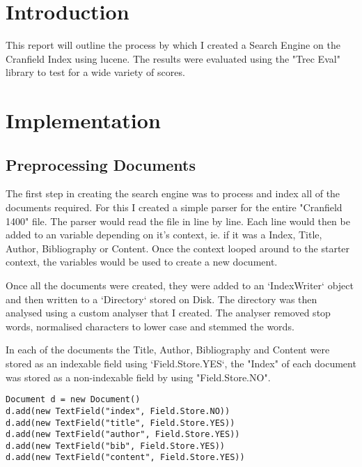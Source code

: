 \section{Introduction}
  This report will outline the process by which I created a Search Engine on the Cranfield Index using lucene.\newline
  The results were evaluated using the "Trec Eval" library to test for a wide variety of scores.

\section{Implementation}
\subsection{Preprocessing Documents}
  The first step in creating the search engine was to process and index all of the documents required. For this I created a simple parser for the entire "Cranfield 1400" file. The parser would read the file in line by line. Each line would then be added to an variable  depending on it's context, ie. if it was a Index, Title, Author, Bibliography or Content. Once the context looped around to the starter context, the variables would be used to create a new document. \par
  Once all the documents were created, they were added to an `IndexWriter` object and then written to a `Directory` stored on Disk. The directory was then analysed using a custom analyser that I created. The analyser removed stop words, normalised characters to lower case and stemmed the words.\par
  In each of the documents the Title, Author, Bibliography and Content were stored as an indexable field using `Field.Store.YES`, the "Index" of each document was stored as a non-indexable field by using "Field.Store.NO".
\begin{lstlisting}
Document d = new Document()
d.add(new TextField("index", Field.Store.NO))
d.add(new TextField("title", Field.Store.YES))
d.add(new TextField("author", Field.Store.YES))
d.add(new TextField("bib", Field.Store.YES))
d.add(new TextField("content", Field.Store.YES))
\end{lstlisting}



